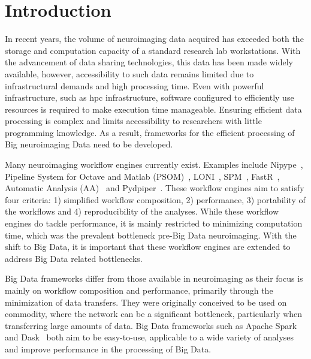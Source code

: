 \chapter{Introduction}

        In recent years, the volume of neuroimaging data acquired has exceeded
        both the storage and computation capacity of a standard research 
        lab workstations. With the advancement of data sharing technologies, 
        this data has been made widely available, however, accessibility to 
        such data remains limited due to infrastructural demands and high processing time.
        Even with powerful infrastructure, such as \gls{hpc} infrastructure, software configured to 
        efficiently use resources is required to make execution time manageable. 
        Ensuring efficient data processing is 
        complex and limits accessibility to researchers with little programming 
        knowledge. As a result, frameworks for the efficient 
        processing of Big neuroimaging Data need to be developed.
        
        Many neuroimaging \gls{workflow} engines currently exist. Examples include
        Nipype~\cite{nipype}, Pipeline System for Octave and Matlab 
        (PSOM)~\cite{10.3389/fninf.2012.00007}, LONI~\cite{REX20031033}, 
        SPM~\cite{spm}, FastR~\cite{10.3389/fict.2016.00015},
        Automatic Analysis (AA)~\cite{10.3389/fninf.2014.00090} and 
        Pydpiper~\cite{10.3389/fninf.2014.00067}. These 
        workflow engines aim to satisfy four criteria: 1) simplified
        workflow composition, 2) performance, 3) portability of the workflows 
        and 4) reproducibility of the analyses. While these workflow engines
        do tackle performance, it is mainly restricted to minimizing computation
        time, which was the prevalent bottleneck pre-Big Data neuroimaging.
        With the shift to Big Data, it is important that these workflow engines are extended
        to address Big Data related bottlenecks.

        Big Data frameworks differ from those available in neuroimaging as their
        focus is mainly on workflow composition and performance, primarily
        through the minimization of data transfers. They were originally conceived
        to be used on \gls{commodity}, where the network can be a significant bottleneck,
        particularly when transferring large amounts of data. Big Data frameworks such as
        Apache Spark~\cite{Zaharia:2016:ASU:3013530.2934664} and
        Dask~\cite{rocklin2015dask} both aim to be easy-to-use, applicable to a
        wide variety of analyses and improve performance in the processing of
        Big Data.

